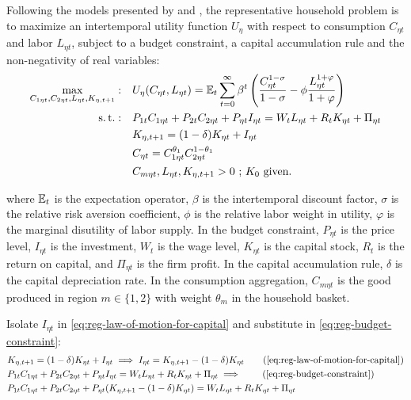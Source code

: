 \documentclass[
	thesis.tex
	]{subfiles}
\begin{document}
Following the models presented by \textcite{costa_junior_understanding_2016} and \textcite{solis-garcia_ucb_2022}, the representative household problem is to maximize an intertemporal utility function $U_{\eta}$ with respect to consumption $C_{\eta t}$ and labor $L_{\eta t}$, subject to a budget constraint, a capital accumulation rule and the non-negativity of real variables:
\begin{align}
	\max_{C_{1\eta t}, C_{2\eta t}, L_{\eta t},K_{\eta, t+1}}: \quad & U_{\eta}(C_{\eta t},L_{\eta t}) = {\mathbb{E}_{t}} \sum_{t=0}^{\infty} \beta^t \left(\frac{C_{\eta t}^{1-\sigma}}{1-\sigma} - \phi \frac{L_{\eta t}^{1+\varphi}}{1+\varphi} \right) \label{eq:reg-utility-function-0} \\
	\operatorname{s.t.}: \quad & P_{1t} C_{1\eta t} + P_{2t} C_{2\eta t} + P_{\eta t} I_{\eta t} = W_t L_{\eta t} + R_t K_{\eta t} + \Pi_{\eta t} \label{eq:reg-budget-constraint} \\
	\quad & K_{\eta, t+1} = (1-\delta)K_{\eta t} + I_{\eta t} \label{eq:reg-law-of-motion-for-capital} \\
	\quad & C_{\eta t} = C_{1\eta t}^{\theta_1} C_{2\eta t}^{1-\theta_1} \label{eq:reg-consumption-aggregation} \\
	\quad & C_{m\eta t}, L_{\eta t}, K_{\eta, t+1} > 0 \text{ ; $K_0$ given.} \nonumber
\end{align}

where ${\mathbb{E}_{t}}$ is the expectation operator, $\beta$ is the intertemporal discount factor, $\sigma$ is the relative risk aversion coefficient, $\phi$ is the relative labor weight in utility, $\varphi$ is the marginal disutility of labor supply. In the budget constraint, $P_{\eta t}$ is the price level, $I_{\eta t}$ is the investment, $W_t$ is the wage level, $K_{\eta t}$ is the capital stock, $R_t$ is the return on capital, and $\Pi_{\eta t}$ is the firm profit. In the capital accumulation rule, $\delta$ is the capital depreciation rate. In the consumption aggregation, $C_{m \eta t}$ is the good produced in region $m \in \{1,2\}$ with weight ${\theta_m}$ in the household basket.

Isolate $I_{\eta t}$ in \ref{eq:reg-law-of-motion-for-capital} and substitute in \ref{eq:reg-budget-constraint}:
\begin{align}
	& K_{\eta, t+1} = (1-\delta)K_{\eta t} + I_{\eta t} \implies I_{\eta t} = K_{\eta, t+1} - (1-\delta)K_{\eta t} \tag{\ref{eq:reg-law-of-motion-for-capital}} \\
	& P_{1t} C_{1\eta t} + P_{2t} C_{2\eta t} + P_{\eta t} I_{\eta t} = W_t L_{\eta t} + R_t K_{\eta t} + \Pi_{\eta t} \implies \tag{\ref{eq:reg-budget-constraint}} \\
	& P_{1t} C_{1\eta t} + P_{2t} C_{2\eta t} + P_{\eta t} (K_{\eta, t+1} - (1-\delta)K_{\eta t}) = W_t L_{\eta t} + R_t K_{\eta t} + \Pi_{\eta t} \label{eq:reg-budget-constraint-2}
\end{align}
\end{document}
